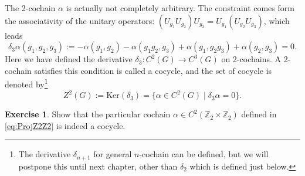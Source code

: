 \documentclass[
]{scrartcl}
\numberwithin{equation}{section}
\theoremstyle{definition}
\theoremstyle{definition}
\theoremstyle{definition}
\newtheorem{exercise}{Exercise}[section]
\theoremstyle{definition}
\theoremstyle{remark}
\begin{document}
The 2-cochain \(\alpha\) is actually not completely arbitrary.
The constraint comes form the associativity of the unitary operators: \((U_{g_1}U_{g_2})U_{g_3} = U_{g_1}(U_{g_2}U_{g_3})\), which leads
\begin{equation}
  \label{eq:cocycle}
  \delta_3 \alpha (g_1,g_2,g_3) := -\alpha(g_1,g_2)-\alpha(g_1g_2,g_3) + \alpha(g_1,g_2g_3) + \alpha(g_2,g_3) = 0.
\end{equation}
Here we have defined the derivative \(\delta_3: C^2(G) \to C^3(G)\) on 2-cochains.
A 2-cochain satisfies this condition is called a cocycle, and the set of cocycle is denoted by\footnote{The derivative \(\delta_{n+1}\) for general \(n\)-cochain can be defined, but we will postpone this until next chapter, other than \(\delta_2\) which is defined just below.}
\begin{equation}
  \label{eq:GroupCocycle}
  Z^2(G) := \mathrm{Ker}(\delta_3) = \{\alpha\in C^2(G)\mid \delta_3 \alpha = 0\}.
\end{equation}

\begin{exercise}
Show that the particular cochain \(\alpha \in C^2(\mathbb{Z}_2\times\mathbb{Z}_2)\) defined in \eqref{eq:ProjZ2Z2} is indeed a cocycle.
\end{exercise}
\end{document}
